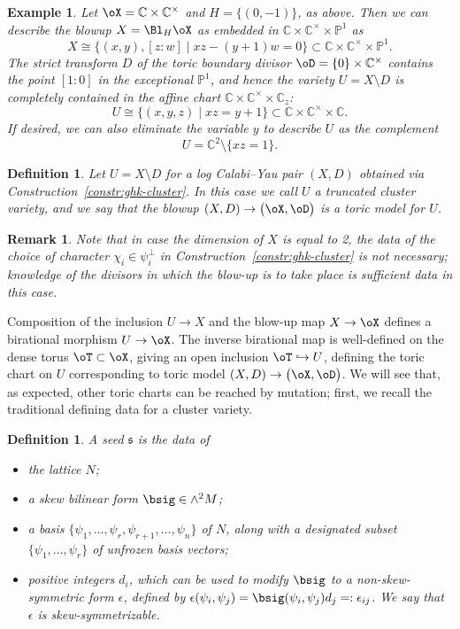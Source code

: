 \documentclass[pdftex]{sigma}%
\numberwithin{equation}{section}
\newtheorem{Definition}[Theorem]{Definition}
\newtheorem{Example}[Theorem]{Example}
\newtheorem{Remark}[Theorem]{Remark} }
\def\CC{\mathbb{C}}
\def\PP{\mathbb{P}}
\newcommand\frs{\mathfrak{s}}
\begin{document}
\begin{Example}\label{ex:bside-ex1}
 Let $\oX = \CC\times \CC^\times$ and $H=\{(0,-1)\}$, as above. Then we can describe the blowup $X = \Bl_H\oX$ as embedded in $\CC\times\CC^\times\times \PP^1$ as
 \[
 X \cong \{(x,y),[z:w]\mid xz-(y+1)w =0\}\subset \CC\times\CC^\times\times\PP^1.
 \]
 The strict transform $D$ of the toric boundary divisor $\oD = \{0\}\times \CC^\times$ contains the point $[1:0]$ in the exceptional $\PP^1$, and hence the variety $U=X\setminus D$ is completely contained in the affine chart $\CC\times\CC^\times\times \CC_z$:
 \[
 U \cong \{(x,y,z)\mid xz = y+1\}\subset \CC\times \CC^\times\times \CC.
 \]
 If desired, we can also eliminate the variable $y$ to describe $U$ as the complement
 \[U=\CC^2\setminus \{xz=1\}.\]
\end{Example}

\begin{Definition}\label{def:toricmodel}
 Let $U = X\setminus D$ for a log Calabi--Yau pair $(X,D)$ obtained via Construction~\ref{constr:ghk-cluster}. In this case we call $U$ a {\em truncated cluster variety}, and we say that the blowup $(X,D)\to \big(\oX,\oD\big)$ is a {\em toric model} for $U$.
\end{Definition}

\begin{Remark} Note that in case the dimension of $X$ is equal to 2, the data of the choice of character $\chi_i\in \psi_i^\perp$ in Construction~\ref{constr:ghk-cluster} is not necessary; knowledge of the divisors in which the blow-up is to take place is sufficient data in this case.
\end{Remark}

Composition of the inclusion $U\to X$ and the blow-up map $X\to \oX$ defines a birational morphism $U\to \oX$. The inverse birational map is well-defined on the dense torus $\oT\subset \oX$, giving an open inclusion $\oT\hookrightarrow U$, defining the toric chart on $U$ corresponding to toric model $(X,D)\to\big(\oX,\oD\big)$. We will see that, as expected, other toric charts can be reached by mutation; first, we recall the traditional defining data for a cluster variety.

\begin{Definition}\label{def:seed}
 A {\em seed} $\frs$ is the data of
 \begin{itemize}\itemsep=0pt
 \item the lattice $N$;
 \item a skew bilinear form $\bsig\in \wedge^2 M$;
 \item a basis $\{\psi_1,\dots,\psi_r,\psi_{r+1},\dots,\psi_n\}$ of $N$, along with a designated subset $\{\psi_1,\dots,\psi_r\}$ of {\em unfrozen} basis vectors;
 \item positive integers $d_i$, which can be used to modify $\bsig$ to a non-skew-symmetric form $\epsilon$, defined by $\epsilon(\psi_i,\psi_j)=\bsig(\psi_i,\psi_j)d_j=:\epsilon_{ij}$. We say that $\epsilon$ is \emph{skew-symmetrizable}.
 \end{itemize}
\end{Definition}
\end{document}
